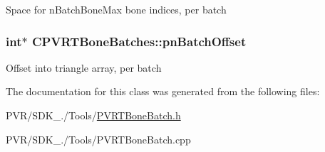 Space for n\+Batch\+Bone\+Max bone indices, per batch \hypertarget{class_c_p_v_r_t_bone_batches_a528439f662d00c261ae6344c5158bd69}{
\subsubsection[{pn\+Batch\+Offset}]{\setlength{\rightskip}{0pt plus 5cm}int$\ast$ C\+P\+V\+R\+T\+Bone\+Batches\+::pn\+Batch\+Offset}}\label{class_c_p_v_r_t_bone_batches_a528439f662d00c261ae6344c5158bd69}
Offset into triangle array, per batch 

The documentation for this class was generated from the following files\+:\begin{DoxyCompactItemize}
\item 
P\+V\+R/\+S\+D\+K\+\_./\+Tools/\hyperlink{_p_v_r_t_bone_batch_8h}{P\+V\+R\+T\+Bone\+Batch.\+h}\item 
P\+V\+R/\+S\+D\+K\+\_./\+Tools/P\+V\+R\+T\+Bone\+Batch.\+cpp\end{DoxyCompactItemize}
